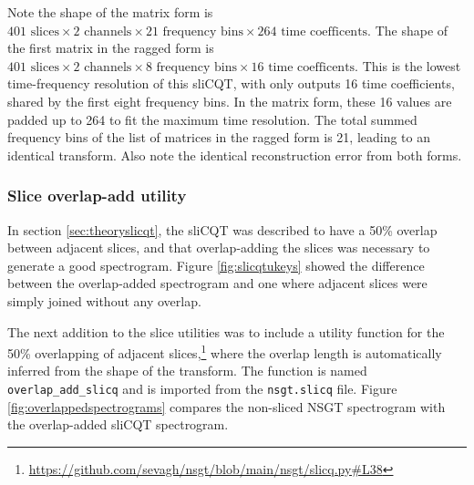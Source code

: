\documentclass[report.tex]{subfiles}
\begin{document}
Note the shape of the matrix form is $401 \text{ slices} \times 2 \text{ channels} \times 21 \text{ frequency bins} \times 264 \text{ time coefficents}$. The shape of the first matrix in the ragged form is $401 \text{ slices} \times 2 \text{ channels} \times 8 \text{ frequency bins} \times 16 \text{ time coefficents}$. This is the lowest time-frequency resolution of this sliCQT, with only outputs 16 time coefficients, shared by the first eight frequency bins. In the matrix form, these 16 values are padded up to 264 to fit the maximum time resolution. The total summed frequency bins of the list of matrices in the ragged form is 21, leading to an identical transform. Also note the identical reconstruction error from both forms.

\subsubsection{Slice overlap-add utility}
\label{sec:slicqola}

In section \ref{sec:theoryslicqt}, the sliCQT was described to have a 50\% overlap between adjacent slices, and that overlap-adding the slices was necessary to generate a good spectrogram. Figure \ref{fig:slicqtukeys} showed the difference between the overlap-added spectrogram and one where adjacent slices were simply joined without any overlap.

The next addition to the slice utilities was to include a utility function for the 50\% overlapping of adjacent slices,\footnote{\url{https://github.com/sevagh/nsgt/blob/main/nsgt/slicq.py\#L38}} where the overlap length is automatically inferred from the shape of the transform. The function is named \Verb#overlap_add_slicq# and is imported from the \Verb#nsgt.slicq# file. Figure \ref{fig:overlappedspectrograms} compares the non-sliced NSGT spectrogram with the overlap-added sliCQT spectrogram.
\end{document}
